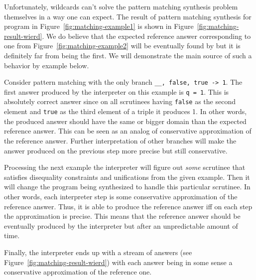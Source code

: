

Unfortunately, wildcards can't solve the pattern matching synthesis problem themselves in a way one can expect.
The result of pattern matching synthesis for program in Figure~\ref{fig:matching-example1} is shown in Figure~\ref{fig:matching-result-wierd}. We do believe that the expected reference answer corresponding to one from Figure~\ref{fig:matching-example2} will be eventually found by \OCanren{} but it is definitely far from being the first.
We will demonstrate the main source of such a behavior by example below.

Consider pattern matching with the only branch \lstinline|__, false, true -> 1|.
The first answer produced by the interpreter on this example is \lstinline|q = 1|.
This is absolutely correct answer since on all scrutinees having \lstinline|false| as the second element and \lstinline|true| as the third element of a triple it produces 1.
In other words, the produced answer should have the same or bigger domain than the expected reference answer.
This can be seen as an analog of conservative approximation of the reference answer.
Further interpretation of other branches will make the answer produced on the previous step more precise but still conservative.

Processing the next example the interpreter will figure out \emph{some} scrutinee that satisfies disequality constraints and unifications from the given example.
Then it will change the program being synthesized to handle this particular scrutinee.
In other words, each interpreter step is some conservative approximation of the reference answer.
Thus, it is able to produce the reference answer iff on each step the approximation is precise.
This means that the reference answer should be eventually produced by the interpreter but after an unpredictable amount of time.

Finally, the interpreter ends up with a stream of answers (see Figure~\ref{fig:matching-result-wierd}) with each answer being in some sense a conservative approximation of the reference one.

